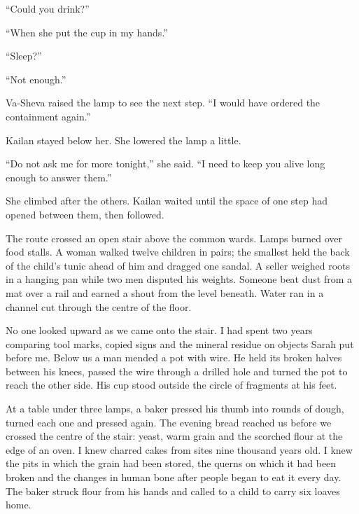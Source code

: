 ``Could you drink?''\par

``When she put the cup in my hands.''\par

``Sleep?''\par

``Not enough.''\par

Va-Sheva raised the lamp to see the next step. ``I would have ordered the containment again.''\par

Kailan stayed below her. She lowered the lamp a little.\par

``Do not ask me for more tonight,'' she said. ``I need to keep you alive long enough to answer them.''\par

She climbed after the others. Kailan waited until the space of one step had opened between them, then followed.\par

\ornament

The route crossed an open stair above the common wards. Lamps burned over food stalls. A woman walked twelve children in pairs; the smallest held the back of the child's tunic ahead of him and dragged one sandal. A seller weighed roots in a hanging pan while two men disputed his weights. Someone beat dust from a mat over a rail and earned a shout from the level beneath. Water ran in a channel cut through the centre of the floor.\par

No one looked upward as we came onto the stair. I had spent two years comparing tool marks, copied signs and the mineral residue on objects Sarah put before me. Below us a man mended a pot with wire. He held its broken halves between his knees, passed the wire through a drilled hole and turned the pot to reach the other side. His cup stood outside the circle of fragments at his feet.\par

At a table under three lamps, a baker pressed his thumb into rounds of dough, turned each one and pressed again. The evening bread reached us before we crossed the centre of the stair: yeast, warm grain and the scorched flour at the edge of an oven. I knew charred cakes from sites nine thousand years old. I knew the pits in which the grain had been stored, the querns on which it had been broken and the changes in human bone after people began to eat it every day. The baker struck flour from his hands and called to a child to carry six loaves home.\par

